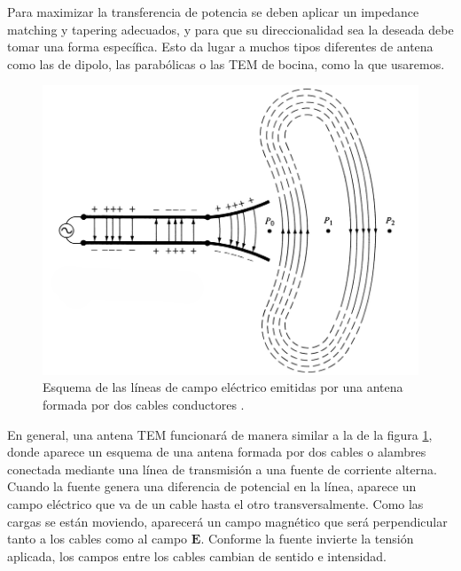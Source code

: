 \documentclass[11pt,a4paper,twoside,pdf]{article}
\numberwithin{equation}{section}
\begin{document}
Para maximizar la transferencia de potencia se deben aplicar un impedance matching y tapering adecuados, y para que su direccionalidad sea la deseada debe tomar una forma específica. Esto da lugar a muchos tipos diferentes de antena como las de dipolo, las parabólicas o las TEM de bocina, como la que usaremos.
\begin{figure}[!h]
    \centering
    \includegraphics[width=0.64\linewidth]{img/fundTeo/dipolo1.png}
    \vspace{-0.3cm}
    \caption{Esquema de las líneas de campo eléctrico emitidas por una antena formada por dos cables conductores \cite{balanis}.}
    \label{fig:dipolo1}
\end{figure}

En general, una antena TEM funcionará de manera similar a la de la figura \ref{fig:dipolo1}, donde aparece un esquema de una antena formada por dos cables o alambres conectada mediante una línea de transmisión a una fuente de corriente alterna. Cuando la fuente genera una diferencia de potencial en la línea, aparece un campo eléctrico que va de un cable hasta el otro transversalmente. Como las cargas se están moviendo, aparecerá un campo magnético que será perpendicular tanto a los cables como al campo $\mathbf{E}$. Conforme la fuente invierte la tensión aplicada, los campos entre los cables cambian de sentido e intensidad.
\end{document}
